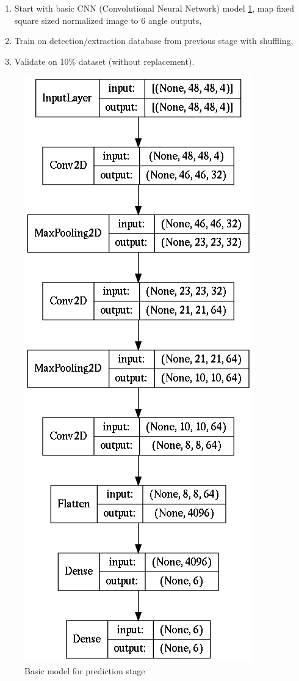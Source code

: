 \begin{enumerate}
    \item Start with basic CNN (Convolutional Neural Network) model \ref{fig:modelCNN}, map fixed square sized normalized image to 6 angle outputs, 
    \item Train on detection/extraction database from previous stage with shuffling, 
    \item Validate on 10\% dataset (without replacement).
\end{enumerate}


\begin{figure}
\centering
\includegraphics[height=0.9\linewidth]{images/model_cnn.png}
\caption{Basic model for prediction stage}
\label{fig:modelCNN}
\end{figure}

